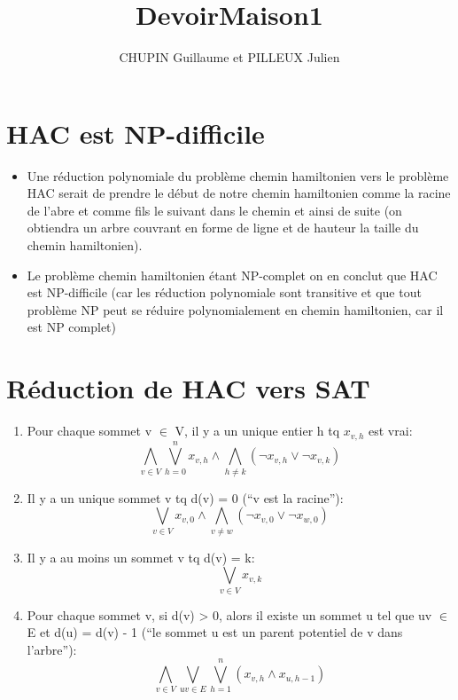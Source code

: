 \documentclass[10pt, a4paper]{article}
\title{DevoirMaison1}
\author {CHUPIN Guillaume et PILLEUX Julien}
\begin{document}
\maketitle
\thispagestyle {empty}
\newpage
\tableofcontents
\newpage

\section {HAC est NP-difficile}
\begin {itemize}
\item Une réduction polynomiale du problème chemin hamiltonien vers le problème HAC serait de prendre le début de notre chemin hamiltonien comme la racine de l'abre et comme fils le suivant dans le chemin et ainsi de suite (on obtiendra un arbre couvrant en forme de ligne et de hauteur la taille du chemin hamiltonien).
\item Le problème chemin hamiltonien étant NP-complet on en conclut que HAC est NP-difficile (car les réduction polynomiale sont transitive et que tout problème NP peut se réduire polynomialement en chemin hamiltonien, car il est NP complet)
\end {itemize}
\section {Réduction de HAC vers SAT}
\begin {enumerate}
\item Pour chaque sommet v $\in$ V, il y a un unique entier h tq $x_{v,h}$ est vrai:
  \[
  \bigwedge_{v \in V}\bigvee_{h=0}^nx_{v,h} \wedge\bigwedge_{h\neq k}(\neg x_{v,h} \vee \neg x_{v,k})
  \]
\item Il y a un unique sommet v tq d(v) = 0 (``v est la racine''):
  \[
  \bigvee_{v\in V}x_{v,0} \wedge \bigwedge_{v\neq w}(\neg x_{v,0} \vee \neg x_{w,0})
  \]
\item Il y a au moins un sommet v tq d(v) = k:
  \[
  \bigvee_{v\in V}x_{v,k}
  \]
\item Pour chaque sommet v, si d(v) > 0, alors il existe un sommet u tel que uv $\in$ E et d(u) = d(v) - 1 (``le sommet u est un parent potentiel de v dans l'arbre''):
  \[
  \bigwedge_{v\in V}\bigvee_{uv\in E}\bigvee_{h=1}^n(x_{v,h} \wedge x_{u,h-1})
  \]
  
\end {enumerate}
\end{document}
